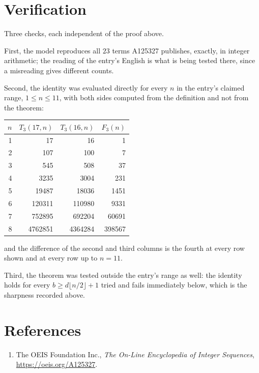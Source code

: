 \documentclass[11pt,a4paper]{article}
\theoremstyle{plain}
\theoremstyle{definition}
\begin{document}
\section{Verification}

Three checks, each independent of the proof above.

First, the model reproduces all $23$ terms A125327 publishes, exactly, in integer
arithmetic; the reading of the entry's English is what is being tested there, since a
misreading gives different counts.

Second, the identity was evaluated directly for every $n$ in the entry's claimed range,
$1\le n\le11$, with both sides computed from the definition and not from the theorem:

\begin{center}
\begin{tabular}{rrrr}
$n$ & $T_{3}(17,n)$ & $T_{3}(16,n)$ & $F_{3}(n)$ \\ \hline
1 & 17 & 16 & 1 \\
2 & 107 & 100 & 7 \\
3 & 545 & 508 & 37 \\
4 & 3235 & 3004 & 231 \\
5 & 19487 & 18036 & 1451 \\
6 & 120311 & 110980 & 9331 \\
7 & 752895 & 692204 & 60691 \\
8 & 4762851 & 4364284 & 398567 \\
\end{tabular}
\end{center}

\noindent and the difference of the second and third columns is the fourth at every row shown
and at every row up to $n=11$.

Third, the theorem was tested outside the entry's range as well: the identity holds for every
$b\ge d\lfloor n/2\rfloor+1$ tried and fails immediately below, which is the sharpness recorded
above.

\section*{References}
\begin{enumerate}
\item The OEIS Foundation Inc., \emph{The On-Line Encyclopedia of Integer Sequences},
\url{https://oeis.org/A125327}.
\end{enumerate}
\end{document}
